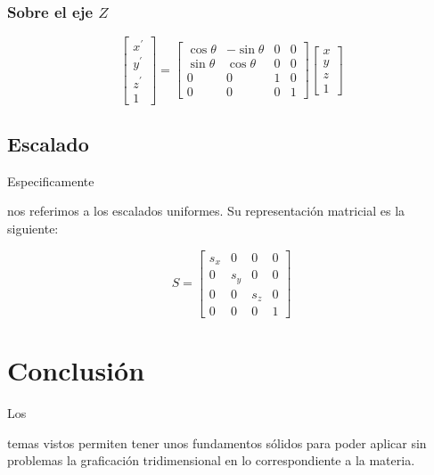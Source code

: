 \documentclass[stu, 12pt, letterpaper, donotrepeattitle, floatsintext, natbib]{apa7}
\begin{document}
    \subsubsection{Sobre el eje \(Z\)}
    \begin{equation*}
        \begin{bmatrix}
            x^{\prime}\\
            y^{\prime}\\
            z^{\prime}\\
            1
        \end{bmatrix}=
        \begin{bmatrix}
            \cos \theta&-\sin \theta&0&0\\
            \sin \theta&\cos \theta&0&0\\
            0&0&1&0\\
            0&0&0&1
        \end{bmatrix}
        \begin{bmatrix}
            x\\
            y\\
            z\\
            1
        \end{bmatrix}
    \end{equation*}
    \vspace{\baselineskip}
    \subsection{Escalado}
    Especificamente \begin{justifying}
        nos referimos a los escalados uniformes. Su representación matricial es la siguiente:\par
    \end{justifying}
    \begin{equation*}
        S=\begin{bmatrix}
          s_x&0&0&0\\
          0&s_y&0&0\\
          0&0&s_z&0\\
          0&0&0&1  
        \end{bmatrix}
    \end{equation*}
    \vspace{\baselineskip}
    \section{Conclusión}
    Los \begin{justifying}
        temas vistos permiten tener unos fundamentos sólidos para poder aplicar sin problemas la graficación tridimensional
        en lo correspondiente a la materia.\par
    \end{justifying}
    
    \newpage   
    \renewcommand\refname{\textbf{Referencias}}
    
    
\end{document}
